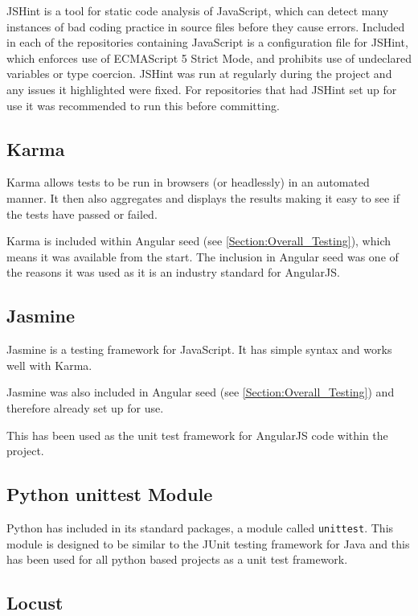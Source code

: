 JSHint is a tool for static code analysis of JavaScript, which can detect many instances of bad coding practice in source files before they cause errors. Included in each of the repositories containing JavaScript is a configuration file for JSHint, which enforces use of ECMAScript 5 Strict Mode, and prohibits use of undeclared variables or type coercion. JSHint was run at regularly during the project and any issues it highlighted were fixed. For repositories that had JSHint set up for use it was recommended to run this before committing.

\subsection{Karma}

Karma allows tests to be run in browsers (or headlessly) in an automated manner.  It then also aggregates and displays the results making it easy to see if the tests have passed or failed.

Karma is included within Angular seed (see \autoref{Section:Overall_Testing}), which means it was available from the start. The inclusion in Angular seed was one of the reasons it was used as it is an industry standard for AngularJS.

\subsection{Jasmine}

Jasmine is a testing framework for JavaScript. It has simple syntax and works well with Karma.

Jasmine was also included in Angular seed (see \autoref{Section:Overall_Testing}) and therefore already set up for use.

This has been used as the unit test framework for AngularJS code within the project.

\subsection{Python unittest Module}

Python has included in its standard packages, a module called \lstinline|unittest|. This module is designed to be similar to the JUnit testing framework for Java and this has been used for all python based projects as a unit test framework.

\subsection{Locust}

